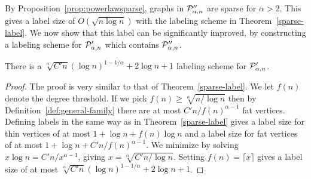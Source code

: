 
By Proposition~\ref{prop:powerlawsparse}, graphs in $ \mathcal{P}''_{\alpha,n}$ are sparse for $\alpha > 2$. This gives a label size of $O(\sqrt{n\log n})$ with the labeling scheme in Theorem~\ref{sparse-label}. We now show that this label can be significantly improved, by constructing a labeling scheme for $ \mathcal{P}'_{\alpha,n}$ which contains $ \mathcal{P}''_{\alpha,n}$.

\begin{theorem}\label{prop:labelingMain}
 There is a $\sqrt[\alpha]{C'n}(\log n)^{1 - 1/\alpha} + 2\log n + 1$ labeling scheme for $ \mathcal{P}'_{\alpha,n}$.
\end{theorem}
\begin{proof}
The proof is very similar to that of Theorem~\ref{sparse-label}. We let $f(n)$ denote the degree threshold. If we pick $f(n)\geq \sqrt[\alpha]{n/\log n}$ then by Definition~\ref{def:general-family}  there are at most $C'n / f(n)^{\alpha -1}$ fat vertices. Defining labels in the same way as in Theorem~\ref{sparse-label} gives a label size for thin vertices of at most $1 + \log n + f(n)\log n$ and a label size for fat vertices of at most
$1 + \log n + C'n / f(n)^{\alpha -1}$.
We minimize by solving
$x \log n = C'n / x^{\alpha -1}$, giving $x = \sqrt[\alpha]{C'n/\log n}$. Setting $f(n) = \lceil x\rceil$ gives a label size of at most $\sqrt[\alpha]{C'n}(\log n)^{1 - 1/\alpha} + 2\log n + 1$.
\end{proof}

